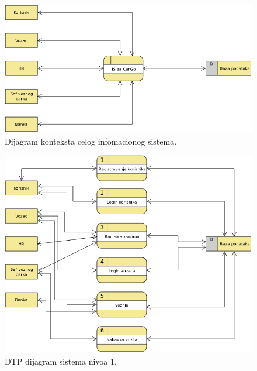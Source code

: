 \documentclass{article}
\begin{document}
\begin{figure}[ht!]
\begin{center}
\includegraphics[width=\textwidth]{CarGoContextDiagram.png}
\end{center}
	\caption{Dijagram konteksta celog infomacionog sistema.}
\label{fig:contextDiagram}
\end{figure}

\begin{figure}[ht!]
\begin{center}
\includegraphics[width=\textwidth]{ISzaCarGo.png}
\end{center}
    \caption{DTP dijagram sistema nivoa 1.}
\label{fig:dtp1}
\end{figure}
\end{document}
